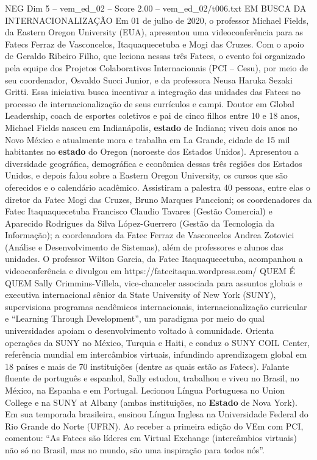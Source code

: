 \begin{textsample}{NEG Dim 5 – vem\_ed\_02 – Score 2.00 – vem\_ed\_02/t006.txt}  \label{ex:f5_neg_089}
EM BUSCA DA INTERNACIONALIZAÇÃO Em 01 de julho de 2020, o professor Michael Fields, da Eastern Oregon University (EUA), apresentou uma videoconferência para as Fatecs Ferraz de Vasconcelos, Itaquaquecetuba e Mogi das Cruzes.
Com o apoio de Geraldo Ribeiro Filho, que leciona nessas três Fatecs, o evento foi organizado pela equipe dos Projetos Colaborativos Internacionais (PCI – Cesu), por meio de seu coordenador, Osvaldo Succi Junior, e da professora Neusa Haruka Sezaki Gritti.
Essa iniciativa busca incentivar a integração das unidades das Fatecs no processo de internacionalização de seus currículos e campi.
Doutor em Global Leadership, coach de esportes coletivos e pai de cinco filhos entre 10 e 18 anos, Michael Fields nasceu em Indianápolis, \textbf{estado} de Indiana; viveu dois anos no Novo México e atualmente mora e trabalha em La Grande, cidade de 15 mil habitantes no \textbf{estado} do Oregon (noroeste dos Estados Unidos).
Apresentou a diversidade geográfica, demográfica e econômica dessas três regiões dos Estados Unidos, e depois falou sobre a Eastern Oregon University, os cursos que são oferecidos e o calendário acadêmico.
Assistiram a palestra 40 pessoas, entre elas o diretor da Fatec Mogi das Cruzes, Bruno Marques Panccioni; os coordenadores da Fatec Itaquaquecetuba Francisco Claudio Tavares (Gestão Comercial) e Aparecido Rodrigues da Silva López-Guerrero (Gestão da Tecnologia da Informação); a coordenadora da Fatec Ferraz de Vasconcelos Andrea Zotovici (Análise e Desenvolvimento de Sistemas), além de professores e alunos das unidades.
O professor Wilton Garcia, da Fatec Itaquaquecetuba, acompanhou a videoconferência e divulgou em https://fatecitaqua.wordpress.com/ QUEM É QUEM Sally Crimmins-Villela, vice-chanceler associada para assuntos globais e executiva internacional sênior da State University of New York (SUNY), supervisiona programas acadêmicos internacionais, internacionalização curricular e “Learning Through Development”, um paradigma por meio do qual universidades apoiam o desenvolvimento voltado à comunidade.
Orienta operações da SUNY no México, Turquia e Haiti, e conduz o SUNY COIL Center, referência mundial em intercâmbios virtuais, infundindo aprendizagem global em 18 países e mais de 70 instituições (dentre as quais estão as Fatecs).
Falante fluente de português e espanhol, Sally estudou, trabalhou e viveu no Brasil, no México, na Espanha e em Portugal.
Lecionou Língua Portuguesa no Union College e na SUNY at Albany (ambas instituições, no \textbf{Estado} de Nova York).
Em sua temporada brasileira, ensinou Língua Inglesa na Universidade Federal do Rio Grande do Norte (UFRN).
Ao receber a primeira edição do VEm com PCI, comentou: “As Fatecs são líderes em Virtual Exchange (intercâmbios virtuais) não só no Brasil, mas no mundo, são uma inspiração para todos nós”.

\end{textsample}
